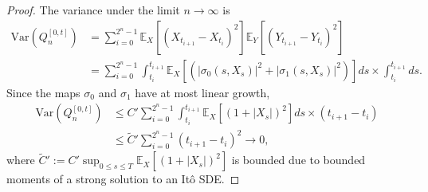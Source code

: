 \documentclass[10pt,a4paper]{amsart}
\begin{document}
\begin{proof}
    The variance under the limit $n\to\infty$ is
    \begin{align*}
        \text{Var}(Q_n^{[0,t]}) &= \sum_{i=0}^{2^n-1} \mathbb{E}_X[(X_{t_{i+1}}-X_{t_i})^2]\mathbb{E}_Y[(Y_{t_{i+1}}-Y_{t_i})^2] \\
        &= \sum_{i=0}^{2^n-1}\int_{t_i}^{t_{i+1}}\mathbb{E}_X\left[(|\sigma_0(s,X_s)|^2+|\sigma_1(s,X_s)|^2)\right]ds\times\int_{t_i}^{t_{i+1}}ds.
    \end{align*}
    Since the maps $\sigma_0$ and $\sigma_1$ have at most linear growth,
    \begin{align*}
        \text{Var}(Q_n^{[0,t]}) &\leq C'\sum_{i=0}^{2^n-1}\int_{t_i}^{t_{i+1}}\mathbb{E}_X[(1+|X_s|)^2]ds\times (t_{i+1}-t_i)\\
        &\leq \tilde{C}'\sum_{i=0}^{2^n-1}(t_{i+1}-t_i)^2\to 0,
    \end{align*}
    where $\tilde{C}' := C'\sup_{0\leq s\leq T}\mathbb{E}_X[(1+|X_s|)^2]$ is bounded due to bounded moments of a strong solution to an It\^o SDE.


\end{proof}
\end{document}
